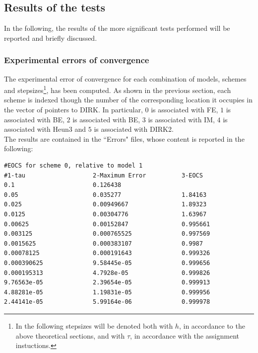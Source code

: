 \documentclass[11pt]{article}
\theoremstyle{theorem}
\theoremstyle{definition}
\begin{document}
\subsection{Results of the tests}
In the following, the results of the more significant tests performed will be reported and briefly discussed.\\

\subsubsection{Experimental errors of convergence}
The experimental error of convergence for each combination of models, schemes and stepsizes\footnote{In the following stepsizes will be denoted both with $h$, in accordance to the above theoretical sections, and with $\tau$, in accordance with the assignment instuctions.}, has been computed. As shown in the previous section, each scheme is indexed though the number of the corresponding location it occupies in the vector of pointers to DIRK. In particular, $0$ is associated with FE, $1$ is associated with BE, $2$ is associated with BE, $3$ is associated with IM, $4$ is associated with Heun3 and $5$ is associated with DIRK2.\\


 The results are contained in the ``Errors" files, whose content is reported in the following:


\begin{lstlisting}
#EOCS for scheme 0, relative to model 1
#1-tau                   2-Maximum Error          3-EOCS                   
0.1                      0.126438                 	
0.05                     0.035277                 1.84163
0.025                    0.00949667               1.89323
0.0125                   0.00304776               1.63967
0.00625                  0.00152847               0.995661
0.003125                 0.000765525              0.997569
0.0015625                0.000383107              0.9987
0.00078125               0.000191643              0.999326
0.000390625              9.58445e-05              0.999656
0.000195313              4.7928e-05               0.999826
9.76563e-05              2.39654e-05              0.999913
4.88281e-05              1.19831e-05              0.999956
2.44141e-05              5.99164e-06              0.999978
\end{lstlisting}
\end{document}
